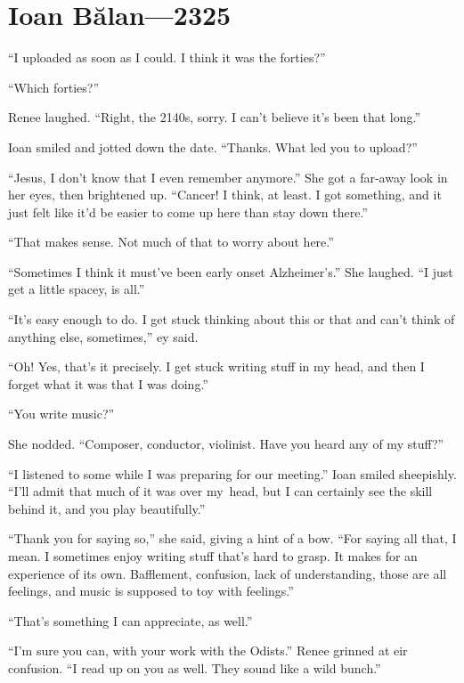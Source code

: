 \hypertarget{ioan-bux103lan-2325}{%
\chapter{Ioan Bălan—2325}\label{ioan-bux103lan-2325}}

``I uploaded as soon as I could. I think it was the forties?''

``Which forties?''

Renee laughed. ``Right, the 2140s, sorry. I can't believe it's been that long.''

Ioan smiled and jotted down the date. ``Thanks. What led you to upload?''

``Jesus, I don't know that I even remember anymore.'' She got a far-away look in her eyes, then brightened up. ``Cancer! I think, at least. I got something, and it just felt like it'd be easier to come up here than stay down there.''

``That makes sense. Not much of that to worry about here.''

``Sometimes I think it must've been early onset Alzheimer's.'' She laughed. ``I just get a little spacey, is all.''

``It's easy enough to do. I get stuck thinking about this or that and can't think of anything else, sometimes,'' ey said.

``Oh! Yes, that's it precisely. I get stuck writing stuff in my head, and then I forget what it was that I was doing.''

``You write music?''

She nodded. ``Composer, conductor, violinist. Have you heard any of my stuff?''

``I listened to some while I was preparing for our meeting.'' Ioan smiled sheepishly. ``I'll admit that much of it was over my\pagebreak\ head, but I can certainly see the skill behind it, and you play beautifully.''

``Thank you for saying so,'' she said, giving a hint of a bow. ``For saying all that, I mean. I sometimes enjoy writing stuff that's hard to grasp. It makes for an experience of its own. Bafflement, confusion, lack of understanding, those are all feelings, and music is supposed to toy with feelings.''

``That's something I can appreciate, as well.''

``I'm sure you can, with your work with the Odists.'' Renee grinned at eir confusion. ``I read up on you as well. They sound like a wild bunch.''

